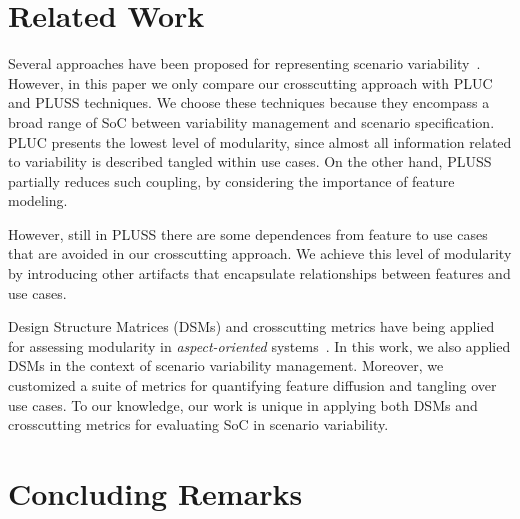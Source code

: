 \documentclass{acm_proc_article-sp}
\begin{document}
\section{Related Work}
\label{related-work}

Several approaches have been proposed for representing 
scenario variability~\cite{jacobson-reuse-book, favaro-icsr-98, eriksson-splc-2005,bertolino-esec-2003}. However, in this 
paper we only compare our crosscutting approach with PLUC and 
PLUSS techniques. We choose these techniques because they encompass a broad range of SoC between 
variability management and scenario specification. PLUC presents the lowest level of 
modularity, since almost all information related to variability is described tangled within use cases. On the other hand, PLUSS 
partially reduces such coupling, by considering the importance of feature modeling.
 
However, still in PLUSS there are some dependences from feature to use cases that are avoided in our crosscutting approach. We 
achieve this level of modularity by introducing other artifacts that encapsulate relationships between features and use cases. 

Design Structure Matrices (DSMs) and crosscutting metrics have being applied for assessing modularity in \emph{aspect-oriented} 
systems~\cite{vlopes-aosd-2005, sullivan-fse-2005,garcia-taosd-2005, greenwood-ecoop-2007}. In this work, we also applied DSMs in the context of scenario variability management. Moreover, we customized a suite of metrics for quantifying feature diffusion and tangling over use cases. To our knowledge, our work is unique in applying both DSMs and crosscutting metrics for evaluating SoC in scenario variability.





\section{Concluding Remarks}
\label{concluding-remarks}
\end{document}
